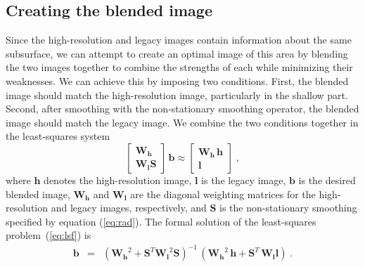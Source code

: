 \subsection{Creating the blended image}
    
    Since the high-resolution and legacy images contain information about the same subsurface, we can attempt to create an optimal image of this area by blending the two images together to combine the strengths of each while minimizing their weaknesses.
    We can achieve this by imposing two conditions. 
    First, the blended image should match the high-resolution image, particularly in the shallow part. 
    Second, after smoothing with the non-stationary smoothing operator, the blended image should match the legacy image. 
    We combine the two conditions together in the least-squares system
    \begin{equation}
        \label{eq:lsf}
        \left[\begin{array}{c} \mathbf{W_h} \\
                \mathbf{W_lS} \end{array}\right]\,\mathbf{b} \approx \left[\begin{array}{c} \mathbf{W_h\,h} \\
                \mathbf{l} \end{array}\right]\;,
    \end{equation}
    where $\mathbf{h}$ denotes the high-resolution image, $\mathbf{l}$ is the legacy image, $\mathbf{b}$ is the desired blended image, $\mathbf{W_h}$ and $\mathbf{W_l}$ are the diagonal weighting matrices for the high-resolution and legacy images, respectively, and $\mathbf{S}$ is the non-stationary smoothing specified by equation (\ref{eq:rad}). 
    The formal solution of the least-squares problem~(\ref{eq:lsf}) is
    \begin{eqnarray}
        \mathbf{b} & = & \left(\mathbf{W_h}^2 + \mathbf{S}^T\mathbf{W_l}^2\mathbf{S}\right)^{-1}\,\left(\mathbf{W_h}^2\,\mathbf{h}+\mathbf{S}^T\,\mathbf{W_l}\mathbf{l}\right)\;.
        \label{eq:inv}
    \end{eqnarray}
    
